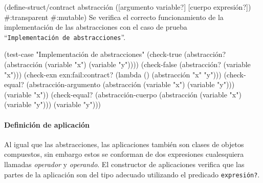 \documentclass[10pt,oneside,openany,letterpaper]{book}
\begin{document}
\nwenddocs{}\endmoddef
(define-struct/contract abstracción
  ([argumento variable?] [cuerpo expresión?])
  #:transparent
  #:mutable)
\eatline
{}\nwendcode{}\nwdocspar
Se verifica el correcto funcionamiento de la implementación de las abstracciones con el caso de prueba ``{\tt{}Implementación\ de\ abstracciones}''.

\nwenddocs{}\plusendmoddef
(test-case "Implementación de abstracciones"  
  (check-true (abstracción? (abstracción (variable "x") (variable "y"))))
  (check-false (abstracción? (variable "x")))
  (check-exn exn:fail:contract? (lambda () (abstracción "x" "y")))
  (check-equal? (abstracción-argumento (abstracción (variable "x") (variable "y")))
                (variable "x"))
  (check-equal? (abstracción-cuerpo (abstracción (variable "x") (variable "y")))
                (variable "y")))
\nwendcode{}\nwdocspar

\paragraph{Definición de aplicación} Al igual que las abstracciones, las aplicaciones también son clases de objetos compuestos, sin embargo estos se conforman de dos expresiones cualesquiera llamadas \emph{operador} y \emph{operando}. El constructor de aplicaciones verifica que las partes de la aplicación son del tipo adecuado utilizando el predicado {\tt{}\protect{}expresión?}.
\end{document}
